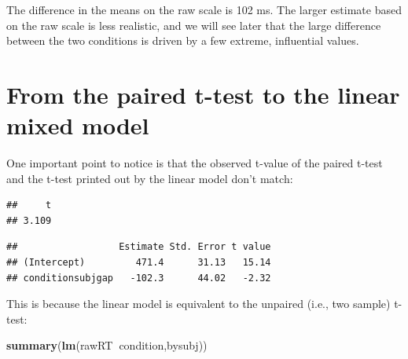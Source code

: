\documentclass[12pt,]{krantz}
\newenvironment{Shaded}{\begin{snugshade}}{\end{snugshade}}
\newcommand{\DataTypeTok}[1]{\textcolor[rgb]{0.13,0.29,0.53}{#1}}
\newcommand{\DecValTok}[1]{\textcolor[rgb]{0.00,0.00,0.81}{#1}}
\newcommand{\KeywordTok}[1]{\textcolor[rgb]{0.13,0.29,0.53}{\textbf{#1}}}
\newcommand{\NormalTok}[1]{#1}
\newcommand{\OperatorTok}[1]{\textcolor[rgb]{0.81,0.36,0.00}{\textbf{#1}}}
\newcommand{\OtherTok}[1]{\textcolor[rgb]{0.56,0.35,0.01}{#1}}
\begin{document}
The difference in the means on the raw scale is 102 ms.
The larger estimate based on the raw scale is less realistic, and we will see later that the large difference between the two conditions is driven by a few extreme, influential values.

\hypertarget{from-the-paired-t-test-to-the-linear-mixed-model}{%
\section{From the paired t-test to the linear mixed model}\label{from-the-paired-t-test-to-the-linear-mixed-model}}

One important point to notice is that the observed t-value of the paired t-test and the t-test printed out by the linear model don't match:

\begin{Shaded}
\end{Shaded}

\begin{verbatim}
##     t 
## 3.109
\end{verbatim}

\begin{Shaded}
\end{Shaded}

\begin{verbatim}
##                  Estimate Std. Error t value
## (Intercept)         471.4      31.13   15.14
## conditionsubjgap   -102.3      44.02   -2.32
\end{verbatim}

This is because the linear model is equivalent to the unpaired (i.e., two sample) t-test:

\begin{Shaded}
\begin{Highlighting}[]
\KeywordTok{summary}\NormalTok{(}\KeywordTok{lm}\NormalTok{(rawRT}\OperatorTok{~}\NormalTok{condition,bysubj))}
\end{Highlighting}
\end{Shaded}
\end{document}
